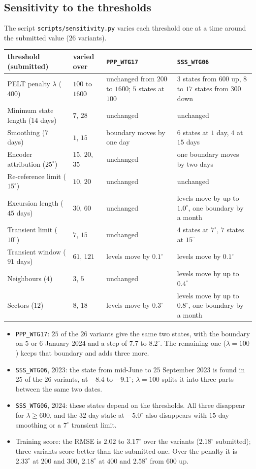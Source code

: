 \documentclass[11pt,a4paper]{article}
\theoremstyle{remark}
\newcommand{\dg}{^{\circ}}
\newcommand{\code}[1]{\texttt{#1}}
\begin{document}
\subsection{Sensitivity to the thresholds}\label{sec:sensitivity}
The script \code{scripts/sensitivity.py} varies each threshold one at a time
around the submitted value ($26$ variants).
\begin{center}\small
\begin{tabular}{@{}p{3.8cm}p{1.9cm}p{3.9cm}p{4.9cm}@{}}
\toprule
threshold (submitted) & varied over & \code{PPP\_WTG17} & \code{SSS\_WTG06} \\
\midrule
PELT penalty $\lambda$ ($400$) & $100$ to $1600$ & unchanged from $200$ to $1600$; $5$ states at $100$ & $3$ states from $600$ up, $8$ to $17$ states from $300$ down \\
Minimum state length ($14$ days) & $7$, $28$ & unchanged & unchanged \\
Smoothing ($7$ days) & $1$, $15$ & boundary moves by one day & $6$ states at $1$ day, $4$ at $15$ days \\
Encoder attribution ($25\dg$) & $15$, $20$, $35$ & unchanged & one boundary moves by two days \\
Re-reference limit ($15\dg$) & $10$, $20$ & unchanged & unchanged \\
Excursion length ($45$ days) & $30$, $60$ & unchanged & levels move by up to $1.0\dg$, one boundary by a month \\
Transient limit ($10\dg$) & $7$, $15$ & unchanged & $4$ states at $7\dg$, $7$ states at $15\dg$ \\
Transient window ($91$ days) & $61$, $121$ & levels move by $0.1\dg$ & levels move by $0.1\dg$ \\
Neighbours ($4$) & $3$, $5$ & unchanged & levels move by up to $0.4\dg$ \\
Sectors ($12$) & $8$, $18$ & levels move by $0.3\dg$ & levels move by up to $0.8\dg$, one boundary by a month \\
\bottomrule
\end{tabular}
\end{center}
\begin{itemize}
\item \code{PPP\_WTG17}: $25$ of the $26$ variants give the same two states,
      with the boundary on 5 or 6 January 2024 and a step of $7.7$ to
      $8.2\dg$. The remaining one ($\lambda=100$) keeps that boundary and adds
      three more.
\item \code{SSS\_WTG06}, 2023: the state from mid-June to 25 September 2023 is
      found in $25$ of the $26$ variants, at $-8.4$ to $-9.1\dg$; $\lambda=100$
      splits it into three parts between the same two dates.
\item \code{SSS\_WTG06}, 2024: these states depend on the thresholds. All three
      disappear for $\lambda\ge600$, and the $32$-day state at $-5.0\dg$ also
      disappears with $15$-day smoothing or a $7\dg$ transient limit.
\item Training score: the RMSE is $2.02$ to $3.17\dg$ over the variants
      ($2.18\dg$ submitted); three variants score better than the submitted
      one. Over the penalty it is $2.33\dg$ at $200$ and $300$, $2.18\dg$ at
      $400$ and $2.58\dg$ from $600$ up.
\end{itemize}
\end{document}
